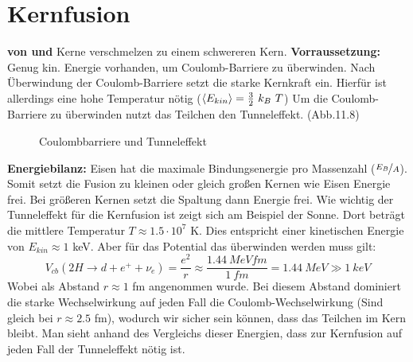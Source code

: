 \documentclass[Ex4_Zusammenfassung.tex]{subfiles}
\begin{document}
\section{Kernfusion}
\textbf{von \michi und \anton}  Kerne verschmelzen zu einem schwereren Kern. \newline
\textbf{Vorraussetzung:} Genug kin. Energie vorhanden, um Coulomb-Barriere zu überwinden. \newline
Nach Überwindung der Coulomb-Barriere setzt die starke Kernkraft ein. Hierfür ist allerdings eine hohe Temperatur nötig ($\braket{E_{kin}} = \frac{3}{2} \ k_B \ T $) \newline
Um die Coulomb-Barriere zu überwinden nutzt das Teilchen den Tunneleffekt. (Abb.11.8)
\begin{figure}[H]
\centering
{}
\caption{Coulombbarriere und Tunneleffekt}
\end{figure}
\textbf{Energiebilanz:} \newline
Eisen hat die maximale Bindungsenergie pro Massenzahl ($\nicefrac{E_B}{A}$). Somit setzt die Fusion zu kleinen oder gleich großen Kernen wie Eisen Energie frei. Bei größeren Kernen setzt die Spaltung dann Energie frei. \newline
Wie wichtig der Tunneleffekt für die Kernfusion ist zeigt sich am Beispiel der Sonne. Dort beträgt die mittlere Temperatur $T \approx 1.5 \cdot 10^7$ K.  Dies entspricht einer kinetischen Energie von $E_{kin} \approx 1$ keV. Aber für das Potential das überwinden werden muss gilt: 
\begin{equation}
V_{cb} (2H \rightarrow d + e^+ + \nu_{e}) = \frac{e^2}{r} \approx \frac{1.44 \  MeV fm}{1 \ fm} = 1.44 \ MeV \gg 1 \  keV
\end{equation}
Wobei als Abstand $r \approx 1$ fm angenommen wurde. Bei diesem Abstand dominiert die starke Wechselwirkung auf jeden Fall die Coulomb-Wechselwirkung (Sind gleich bei $r \approx 2.5$ fm), wodurch wir sicher sein können, dass das Teilchen im Kern bleibt. \newline
Man sieht anhand des Vergleichs dieser Energien, dass zur Kernfusion auf jeden Fall der Tunneleffekt nötig ist.
\end{document}
